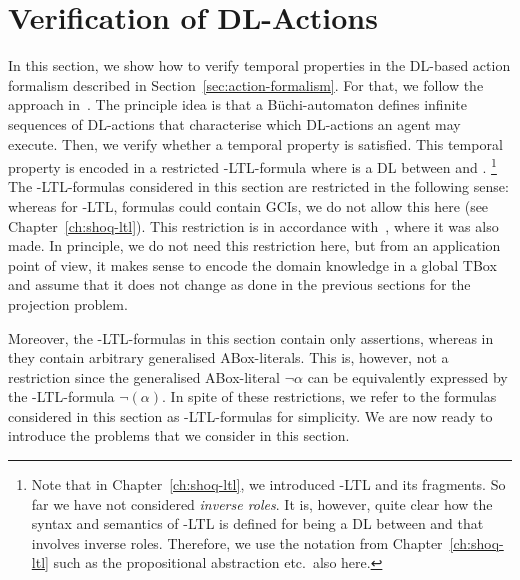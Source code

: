 \section{Verification of DL-Actions}\label{sec:verifying-actions}

In this section, we show how to verify temporal properties in the DL-based
action formalism described in Section~\ref{sec:action-formalism}.  For that, we
follow the approach in~\cite{BaLM-ECAI10}.  The principle idea is that a
Büchi-automaton defines infinite sequences of DL-actions that characterise which
DL-actions an agent may execute.  Then, we verify whether a temporal property is
satisfied.  This temporal property is encoded in a restricted \Lmc-LTL-formula
where \Lmc is a DL between \ALC and \ALCQIO.%
\footnote{Note that in Chapter~\ref{ch:shoq-ltl}, we introduced \SHOQ-LTL and
    its fragments.  So far we have not considered \emph{inverse roles}.  It is,
    however, quite clear how the syntax and semantics of \Lmc-LTL is defined for
    \Lmc being a DL between \ALC and \ALCQIO that involves inverse roles.
    Therefore, we use the notation from Chapter~\ref{ch:shoq-ltl} such as the
    propositional abstraction etc.\ also here.}
%
The \Lmc-LTL-formulas considered in this section are restricted in the following
sense: whereas for \SHOQ-LTL, formulas could contain GCIs, we do not allow this
here (see Chapter~\ref{ch:shoq-ltl}).  This restriction is in accordance
with~\cite{BaLM-ECAI10}, where it was also made.  In principle, we do not need
this restriction here, but from an application point of view, it makes sense to
encode the domain knowledge in a global TBox and assume that it does not change
as done in the previous sections for the projection problem.

Moreover, the \Lmc-LTL-formulas in this section contain only assertions, whereas
in~\cite{BaLM-ECAI10} they contain arbitrary generalised ABox-literals.  This
is, however, not a restriction since the generalised ABox-literal $\lnot\alpha$
can be equivalently expressed by the \Lmc-LTL-formula $\lnot(\alpha)$.
%
In spite of these restrictions, we refer to the formulas considered in this
section as \Lmc-LTL-formulas for simplicity.
%
We are now ready to introduce the problems that we consider in this section.

